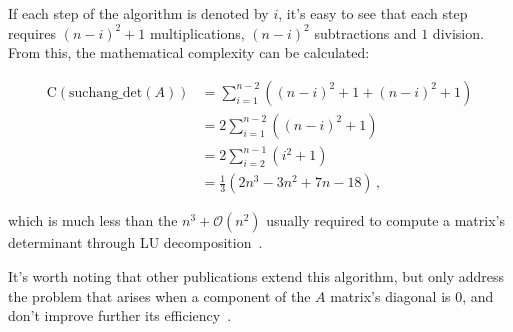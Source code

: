 %

If each step of the algorithm is denoted by $i$, it's easy to see that each step requires $(n-i)^2 + 1$ multiplications, $(n-i)^2$ subtractions and $1$ division.
From this, the mathematical complexity can be calculated:

    \begingroup
    \allowdisplaybreaks
    \begin{align}
        \text{C}(\text{suchang\_det}(A)) &= \sum_{i=1}^{n-2} ((n-i)^2 + 1 + (n-i)^2 + 1)\nonumber\\
        &= 2\sum_{i=1}^{n-2} ((n-i)^2 + 1)\nonumber\\
        &= 2\sum_{i=2}^{n-1} (i^2 + 1)\nonumber\\
        &= \frac{1}{3}(2n^3 - 3n^2 + 7n - 18)\,,\label{eq:suchang_complexity}
    \end{align}
    \endgroup
    
which is much less than the $n^3 + \mathcal{O}(n^2)$ usually required to compute a matrix's determinant through LU decomposition~\cite{banachiewicz1937berechnung}.

It's worth noting that other publications extend this algorithm, but only address the problem that arises when a component of the $A$ matrix's diagonal is $0$, and don't improve further its efficiency~\cite{chang1998more,chang2014determinant}.